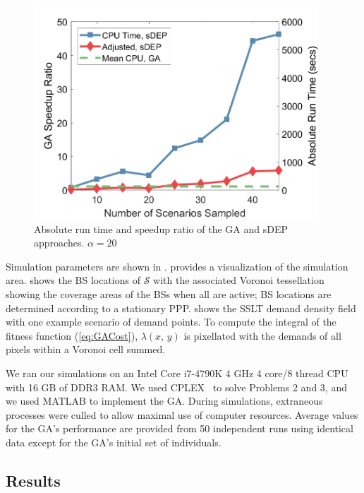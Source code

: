 \documentclass[conference]{IEEEtran}
\begin{document}
\begin{figure}[t]
\begin{minipage}{0.64\textwidth}
		\label{fig:NetworkArea}
	\end{minipage} \hfill
	\begin{minipage}{0.32\textwidth}
		\centering
		\includegraphics[width=0.95\textwidth]{Figures/VOSGA_SpeedupRatio_AbsComp_alpha20}
		\caption{\small Absolute run time and speedup ratio of the GA and sDEP approaches. $\alpha = 20$}
		\label{fig:AlgSpeedupRunTime}
	\end{minipage}
\end{figure}

Simulation parameters are shown in .   provides a visualization of the simulation area.   shows the BS locations of $\mathcal{S}$ with the associated Voronoi tessellation showing the coverage areas of the BSs when all are active; BS locations are determined according to a stationary PPP.   shows the SSLT demand density field with one example scenario of demand points.  To compute the integral of the fitness function (\cref{eq:GACost}), $\lambda\left( x,\, y \right)$ is pixellated with the demands of all pixels within a Voronoi cell summed.

We ran our simulations on an Intel Core i7-4790K 4 GHz 4 core/8 thread CPU with 16 GB of DDR3 RAM.  We used CPLEX~\cite{Cplex} to solve Problems 2 and 3, and we used MATLAB to implement the GA.  During simulations, extraneous processes were culled to allow maximal use of computer resources.  Average values for the GA's performance are provided from 50 independent runs using identical data except for the GA's initial set of individuals.

\subsection{Results} \label{subsec:results}
\end{document}
